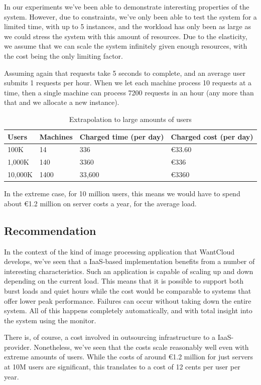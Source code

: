 \documentclass[conference]{IEEEtran}
\begin{document}
In our experiments we've been able to demonstrate interesting properties of the system. However, due to constraints, we've only been able to test the system for a limited time, with up to 5 instances, and the workload has only been as large as we could stress the system with this amount of resources. Due to the elasticity, we assume that we can scale the system infinitely given enough resources, with the cost being the only limiting factor.

Assuming again that requests take 5 seconds to complete, and an average user submits 1 requests per hour. When we let each machine process 10 requests at a time, then a single machine can process 7200 requests in an hour (any more than that and we allocate a new instance).

\begin{table}[H]
  \centering
  \begin{tabular}{| l | l | l | l |}
    \hline
    Users & Machines & Charged time (per day) & Charged cost (per day) \\ \hline
    100K & 14 & 336 & \euro 33.60 \\ \hline
    1,000K & 140 & 3360 & \euro 336 \\ \hline
    10,000K & 1400 & 33,600 & \euro 3360 \\ \hline
  \end{tabular}
  \caption{Extrapolation to large amounts of users}
\end{table}

In the extreme case, for 10 million users, this means we would have to spend about \euro 1.2 million on server costs a year, for the average load.

\subsection{Recommendation}
In the context of the kind of image processing application that WantCloud develops, we've seen that a IaaS-based implementation benefits from a number of interesting characteristics. Such an application is capable of scaling up and down depending on the current load. This means that it is possible to support both burst loads and quiet hours while the cost would be comparable to systems that offer lower peak performance. Failures can occur without taking down the entire system. All of this happens completely automatically, and with total insight into the system using the monitor.

There is, of course, a cost involved in outsourcing infrastructure to a IaaS-provider. Nonetheless, we've seen that the costs scale reasonably well even with extreme amounts of users. While the costs of around \euro 1.2 million for just servers at 10M users are significant, this translates to a cost of 12 cents per user per year.
\end{document}

